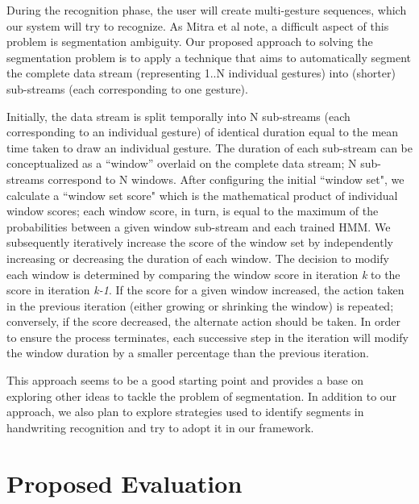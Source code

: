 \documentclass[twoside]{article}
\begin{document}
\begin{multicols}{2}
During the recognition phase, the user will create multi-gesture sequences, which our system will try to recognize. As Mitra et al note, 
a difficult aspect of this problem is segmentation ambiguity. Our proposed approach to solving the segmentation problem is to apply a technique that aims to automatically segment the complete data stream (representing 1..N individual gestures) into (shorter) sub-streams (each corresponding to one gesture).

Initially, the data stream is split temporally into N sub-streams 
(each corresponding to an individual gesture) of identical duration equal to the 
mean time taken to draw an individual gesture.
The duration of each sub-stream can be conceptualized as a ``window'' overlaid
on the complete data stream; N sub-streams correspond to N windows. After
configuring the initial ``window set", we calculate a ``window set score" which is the mathematical product of individual window scores; each window score, in turn, 
is equal to the maximum of the probabilities between a given window sub-stream 
and each trained HMM. We subsequently iteratively increase the score of the window set 
by independently increasing or decreasing the duration of each window. The decision to modify each window is determined by comparing the window score in iteration \emph{k} to the score in iteration \emph{k-1}. If the score for a given window increased, the action taken in the previous iteration (either growing or shrinking the window) is repeated; conversely, if the score decreased, the alternate action should be taken. In order to ensure the process terminates, each successive step in the iteration will modify the window duration by a smaller percentage than the previous iteration.

This approach seems to be a good starting point and provides a base on exploring other ideas to tackle the problem of segmentation. In addition to our approach, we also plan to explore strategies used to identify segments in handwriting recognition \cite{zheng2002segmentation} and try to adopt it in our framework.

\section{Proposed Evaluation}


\end{multicols}
\end{document}

